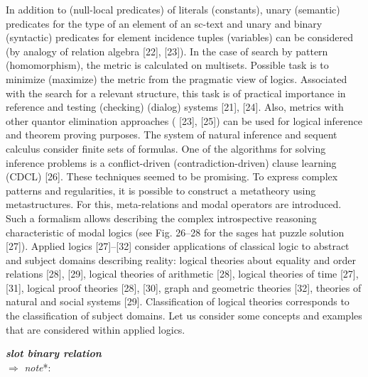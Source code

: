 \documentclass{article}
\begin{document}
\begin{multicols}{2}
\hspace{0.27cm}In addition to (null-local predicates) of literals (constants), unary (semantic) predicates for the type of an
element of an sc-text and unary and binary (syntactic)
predicates for element incidence tuples (variables) can
be considered (by analogy of relation algebra [22], [23]).
In the case of search by pattern (homomorphism), the
metric is calculated on multisets. Possible task is to
minimize (maximize) the metric from the pragmatic
view of logics. Associated with the search for a relevant
structure, this task is of practical importance in reference
and testing (checking) (dialog) systems [21], [24]. Also,
metrics with other quantor elimination approaches ( [23],
[25]) can be used for logical inference and theorem
proving purposes. The system of natural inference and
sequent calculus consider finite sets of formulas. One
of the algorithms for solving inference problems is
a conflict-driven (contradiction-driven) clause learning
(CDCL) [26]. These techniques seemed to be promising.
To express complex patterns and regularities, it is possible
to construct a metatheory using metastructures. For this,
meta-relations and modal operators are introduced. Such
a formalism allows describing the complex introspective
reasoning characteristic of modal logics (see Fig. 26–28
for the sages hat puzzle solution [27]).
\hspace{0.27cm}Applied logics [27]–[32] consider applications of
classical logic to abstract and subject domains describing
reality: logical theories about equality and order relations
[28], [29], logical theories of arithmetic [28], logical
theories of time [27], [31], logical proof theories [28],
[30], graph and geometric theories [32], theories of natural
and social systems [29].
\hspace{0.27cm}Classification of logical theories corresponds to the
classification of subject domains. Let us consider some
concepts and examples that are considered within applied
logics.

\vspace{10pt} 

\begin{tabbing}
 \textbf{\textit{slot binary relation}} \\ $\Rightarrow$ \hspace{0.5cm} \= \textit{note}*: \\ 
\end{tabbing}


\end{multicols}
\end{document}
